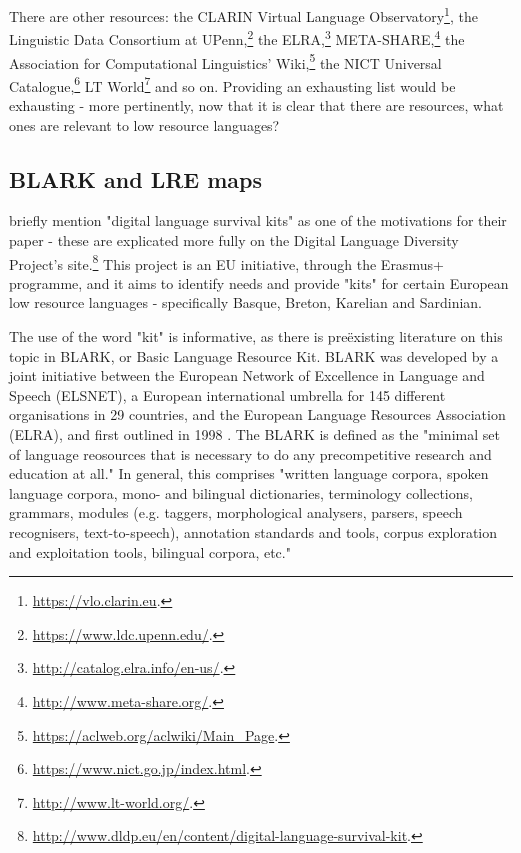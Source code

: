 \begin{itemize}


\end{itemize}

There are other resources: the CLARIN Virtual Language Observatory\footnote{\href{https://vlo.clarin.eu}{https://vlo.clarin.eu}. }, the Linguistic Data Consortium at UPenn,\footnote{\href{https://www.ldc.upenn.edu/}{https://www.ldc.upenn.edu/}. } the ELRA,\footnote{\href{http://catalog.elra.info/en-us/}{http://catalog.elra.info/en-us/}. } META-SHARE,\footnote{\href{http://www.meta-share.org/}{http://www.meta-share.org/}. } the Association for Computational Linguistics' Wiki,\footnote{\href{https://aclweb.org/aclwiki/Main_Page}{https://aclweb.org/aclwiki/Main_Page}. } the NICT Universal Catalogue,\footnote{\href{https://www.nict.go.jp/index.html}{https://www.nict.go.jp/index.html}. } LT World\footnote{\href{http://www.lt-world.org/}{http://www.lt-world.org/}. } and so on. Providing an exhausting list would be exhausting - more pertinently, now that it is clear that there are resources, what ones are relevant to low resource languages?

\subsection{BLARK and LRE maps}
\label{subsec:blark-and-lre-maps}

\citet{soria2017digital} briefly mention "digital language survival kits" as one of the motivations for their paper - these are explicated more fully on the Digital Language Diversity Project's site.\footnote{\href{http://www.dldp.eu/en/content/digital-language-survival-kit}{http://www.dldp.eu/en/content/digital-language-survival-kit}. } This project is an EU initiative, through the Erasmus+ programme, and it aims to identify needs and provide "kits" for certain European low resource languages - specifically Basque, Breton, Karelian and Sardinian.

The use of the word "kit" is informative, as there is  pre\"{e}xisting literature on this topic in BLARK, or Basic Language Resource Kit. BLARK was developed by a joint initiative between the European Network of Excellence in Language and Speech (ELSNET), a European international umbrella for 145 different organisations in 29 countries, and the European Language Resources Association (ELRA), and first outlined in 1998 \citep{krauwer1998elsnet}. The BLARK is defined as the "minimal set of language reosources that is necessary to do any precompetitive research and education at all." \citep[4]{krauwer2003basic} In general, this comprises "written language corpora, spoken language corpora, mono- and bilingual dictionaries, terminology collections, grammars, modules (e.g. taggers, morphological analysers, parsers, speech recognisers, text-to-speech), annotation standards and tools, corpus exploration and exploitation tools, bilingual corpora, etc."

